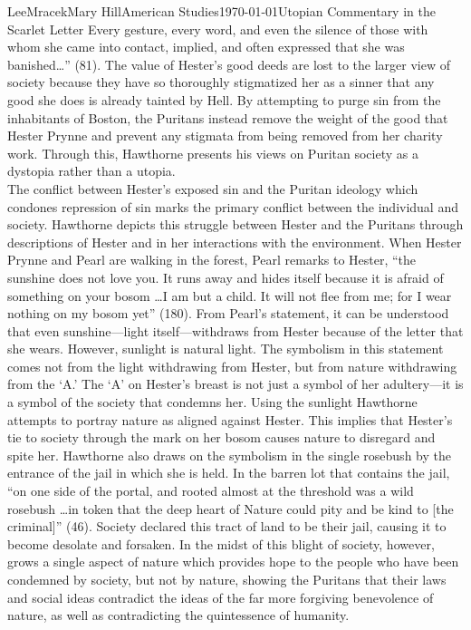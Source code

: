 \documentclass[12pt, letterpaper]{article}
\begin{document}
\begin{mla}{Lee}{Mracek}{Mary Hill}{American Studies}{\today}{Utopian Commentary in the Scarlet Letter}
        Every gesture, every word, and even the silence of those with whom she came into contact, implied, and often expressed that she was banished\ldots'' (81). The value of Hester's good deeds are lost to the larger view of society because they have so thoroughly stigmatized her as a sinner that any good she does is already tainted by Hell. By attempting to purge sin from the inhabitants of Boston, the Puritans instead remove the weight of the good that Hester Prynne  and prevent any stigmata from being removed from her charity work. Through this, Hawthorne presents his views on Puritan society as a dystopia rather than a utopia. \\
        The conflict between Hester’s exposed sin and the Puritan ideology which condones repression of sin marks the primary conflict between the individual and society. Hawthorne depicts this struggle between Hester and the Puritans through descriptions of Hester and in her interactions with the environment. When Hester Prynne and Pearl are walking in the forest, Pearl remarks to Hester, ``the sunshine does not love you. It runs away and hides itself because it is afraid of something on your bosom \ldots I am but a child. It will not flee from me; for I wear nothing on my bosom yet'' (180). 
        From Pearl's statement, it can be understood that even sunshine---light itself---withdraws from Hester because of the letter that she wears. However, sunlight is natural light. The symbolism in this statement comes not from the light withdrawing from Hester, but from nature withdrawing from the `A.' The `A' on Hester's breast is not just a symbol of her adultery---it is a symbol of the society that condemns her. Using the sunlight Hawthorne attempts to portray nature as aligned against Hester. This implies that Hester's tie to society through the mark on her bosom causes nature to disregard and spite her. Hawthorne also draws on the symbolism in the single rosebush by the entrance of the jail in which she is held. In the barren lot that contains the jail, ``on one side of the portal, and rooted almost at the threshold was a wild rosebush \ldots in token that the deep heart of Nature could pity and be kind to [the criminal]'' (46). Society declared this tract of land to be their jail, causing it to become desolate and forsaken. In the midst of this blight of society, however, grows a single aspect of nature which provides hope to the people who have been condemned by society, but not by nature, showing the Puritans that their laws and social ideas contradict the ideas of the far more forgiving benevolence of nature, as well as contradicting the quintessence of humanity.\\

\end{mla}
\end{document}
